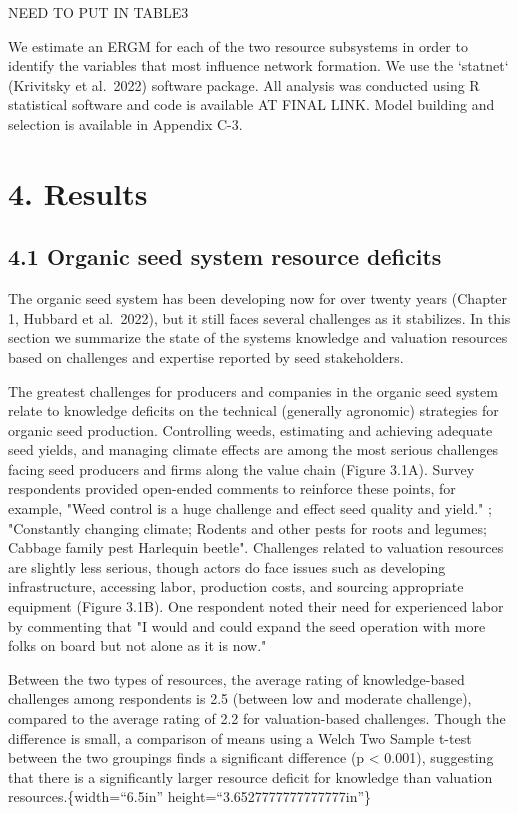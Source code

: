 \documentclass[twoside,12pt,final]{ucthesis-CA2012}
\begin{document}
\begin{ucmainmatter}
NEED TO PUT IN TABLE3

We estimate an ERGM for each of the two resource subsystems in order to
identify the variables that most influence network formation. We use the
`statnet` (Krivitsky et al.~2022) software package. All analysis was
conducted using R statistical software and code is available AT FINAL
LINK. Model building and selection is available in Appendix C-3.

\hypertarget{results-2}{%
\section{4. Results}\label{results-2}}

\hypertarget{organic-seed-system-resource-deficits}{%
\subsection{4.1 Organic seed system resource deficits}\label{organic-seed-system-resource-deficits}}

The organic seed system has been developing now for over twenty years
(Chapter 1, Hubbard et al.~2022), but it still faces several challenges
as it stabilizes. In this section we summarize the state of the
system\textquotesingle s knowledge and valuation resources based on challenges and
expertise reported by seed stakeholders.

The greatest challenges for producers and companies in the organic seed
system relate to knowledge deficits on the technical (generally
agronomic) strategies for organic seed production. Controlling weeds,
estimating and achieving adequate seed yields, and managing climate
effects are among the most serious challenges facing seed producers and
firms along the value chain (Figure 3.1A). Survey respondents provided
open-ended comments to reinforce these points, for example, "Weed
control is a huge challenge and effect seed quality and yield." ;
"Constantly changing climate; Rodents and other pests for roots and
legumes; Cabbage family pest Harlequin beetle". Challenges related to
valuation resources are slightly less serious, though actors do face
issues such as developing infrastructure, accessing labor, production
costs, and sourcing appropriate equipment (Figure 3.1B). One respondent
noted their need for experienced labor by commenting that "I would and
could expand the seed operation with more folks on board but not alone
as it is now."

Between the two types of resources, the average rating of
knowledge-based challenges among respondents is 2.5 (between low and
moderate challenge), compared to the average rating of 2.2 for
valuation-based challenges. Though the difference is small, a comparison
of means using a Welch Two Sample t-test between the two groupings finds
a significant difference (p \textless{} 0.001), suggesting that there is a
significantly larger resource deficit for knowledge than valuation
resources.\{width=``6.5in''
height=``3.6527777777777777in''\}
\begin{figure}


\end{figure}
\end{ucmainmatter}
\end{document}

